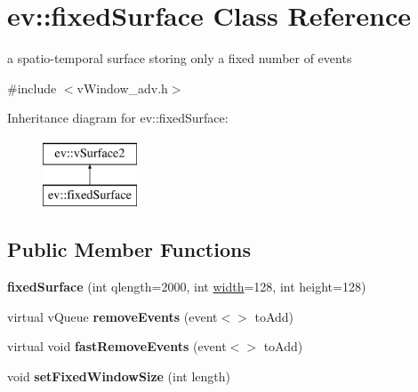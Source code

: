 \hypertarget{classev_1_1fixedSurface}{}\section{ev\+:\+:fixed\+Surface Class Reference}
\label{classev_1_1fixedSurface}


a spatio-\/temporal surface storing only a fixed number of events  




{\ttfamily \#include $<$v\+Window\+\_\+adv.\+h$>$}

Inheritance diagram for ev\+:\+:fixed\+Surface\+:\begin{figure}[H]
\begin{center}
\leavevmode
\includegraphics[height=2.000000cm]{classev_1_1fixedSurface}
\end{center}
\end{figure}
\subsection*{Public Member Functions}
\begin{DoxyCompactItemize}
\item 
\mbox{\label{classev_1_1fixedSurface_adee898e7c65c9c8d41fd20530d9f10b0}} 
{\bfseries fixed\+Surface} (int qlength=2000, int \hyperlink{classev_1_1vSurface2_a1aa8027816352a15d5b9bf1f26f48e76}{width}=128, int height=128)
\item 
\mbox{\label{classev_1_1fixedSurface_ace012acf57456f71d77fc7a349a915d7}} 
virtual v\+Queue {\bfseries remove\+Events} (event$<$$>$ to\+Add)
\item 
\mbox{\label{classev_1_1fixedSurface_a317c375340f308fda67c6da2074f0e0e}} 
virtual void {\bfseries fast\+Remove\+Events} (event$<$$>$ to\+Add)
\item 
\mbox{\label{classev_1_1fixedSurface_ac8249b63b5ada0491d6a6ff70b745488}} 
void {\bfseries set\+Fixed\+Window\+Size} (int length)
\end{DoxyCompactItemize}
